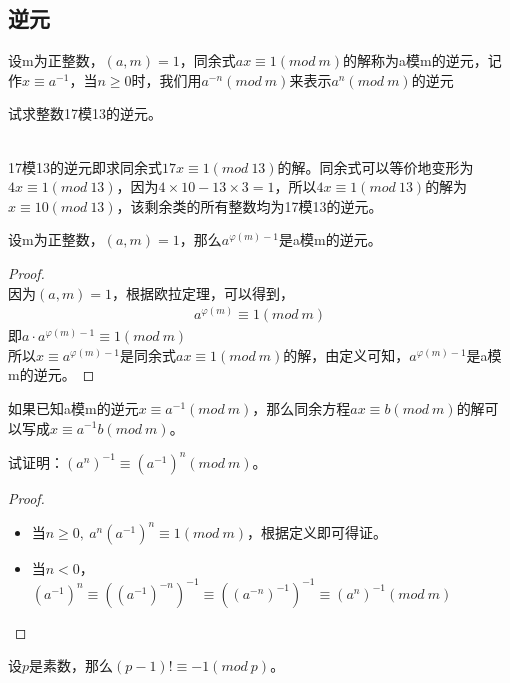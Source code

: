 \documentclass[cn,10pt]{elegantbook}
\begin{document}
\subsection{逆元}
\begin{definition}
  设m为正整数，$(a,m)=1$，同余式$ax \equiv 1(mod\ m)$的解称为a模m的逆元，记作$x \equiv a^{-1}$，当$n \geq 0$时，我们用$a^{-n}(mod\ m)$来表示$a^n(mod\ m)$的逆元
\end{definition}
\begin{example}
  试求整数17模13的逆元。
\end{example}
\begin{solution}
  \\17模13的逆元即求同余式$17x \equiv 1 (mod\ 13)$的解。同余式可以等价地变形为$4x \equiv 1(mod\ 13)$，因为$4 \times 10 - 13 \times 3 =1$，所以$4x \equiv 1(mod \ 13)$的解为$x \equiv 10(mod\ 13)$，该剩余类的所有整数均为17模13的逆元。
\end{solution}
\begin{theorem}
  设m为正整数，$(a,m)=1$，那么$a^{\varphi(m)-1}$是a模m的逆元。
\end{theorem}
\begin{proof}
  \\ 因为$(a,m)=1$，根据欧拉定理，可以得到，
  \begin{align*}
    a^{\varphi(m)} \equiv 1(mod\ m)
  \end{align*}
  即$a \cdot a^{\varphi(m)-1} \equiv 1(mod\ m)$
  \\所以$x \equiv a^{\varphi(m)-1}$是同余式$ax \equiv 1 (mod\ m)$的解，由定义可知，$a^{\varphi(m)-1}$是a模m的逆元。
\end{proof}
\vskip 0.5cm
如果已知a模m的逆元$x \equiv a^{-1}(mod\ m)$，那么同余方程$ax \equiv b(mod\ m)$的解可以写成$x \equiv a^{-1}b(mod\ m)$。
\vskip 0.5cm
\begin{example}
  试证明：$(a^n)^{-1} \equiv (a^{-1})^n(mod\ m)$。
\end{example}
\begin{proof}
  \begin{itemize}
    \item 当$n \geq 0,\ a^n(a^{-1})^n \equiv 1(mod\ m)$，根据定义即可得证。
    \item 当$n < 0$，$(a^{-1})^n \equiv ((a^{-1})^{-n})^{-1} \equiv ((a^{-n})^{-1})^{-1} \equiv (a^n)^{-1}(mod\ m)$
  \end{itemize}
\end{proof}
\begin{theorem}[Wilson定理]
  设$p$是素数，那么$(p-1)! \equiv -1(mod\ p)$。
\end{theorem}
\end{document}
